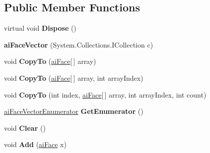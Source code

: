 \subsection*{Public Member Functions}
\begin{DoxyCompactItemize}
\item 
\hypertarget{classai_face_vector_a805a0fcb25db9628b91c89d6a337f52b}{virtual void {\bfseries Dispose} ()}\label{classai_face_vector_a805a0fcb25db9628b91c89d6a337f52b}

\item 
\hypertarget{classai_face_vector_a6437dba829bed1c5d00a5dac8d4e9a30}{{\bfseries ai\+Face\+Vector} (System.\+Collections.\+I\+Collection c)}\label{classai_face_vector_a6437dba829bed1c5d00a5dac8d4e9a30}

\item 
\hypertarget{classai_face_vector_a5ef358b28cd4c62b78876e46b5c23169}{void {\bfseries Copy\+To} (\hyperlink{structai_face}{ai\+Face}\mbox{[}$\,$\mbox{]} array)}\label{classai_face_vector_a5ef358b28cd4c62b78876e46b5c23169}

\item 
\hypertarget{classai_face_vector_a32642741070e3fc5a63b5b078556fe50}{void {\bfseries Copy\+To} (\hyperlink{structai_face}{ai\+Face}\mbox{[}$\,$\mbox{]} array, int array\+Index)}\label{classai_face_vector_a32642741070e3fc5a63b5b078556fe50}

\item 
\hypertarget{classai_face_vector_ae4019a8e13ed8bcb7df709e53d26e8c4}{void {\bfseries Copy\+To} (int index, \hyperlink{structai_face}{ai\+Face}\mbox{[}$\,$\mbox{]} array, int array\+Index, int count)}\label{classai_face_vector_ae4019a8e13ed8bcb7df709e53d26e8c4}

\item 
\hypertarget{classai_face_vector_acd404547f414c39ace482852cfef363a}{\hyperlink{classai_face_vector_1_1ai_face_vector_enumerator}{ai\+Face\+Vector\+Enumerator} {\bfseries Get\+Enumerator} ()}\label{classai_face_vector_acd404547f414c39ace482852cfef363a}

\item 
\hypertarget{classai_face_vector_ac2bec608a686b3da7ce30cb858910378}{void {\bfseries Clear} ()}\label{classai_face_vector_ac2bec608a686b3da7ce30cb858910378}

\item 
\hypertarget{classai_face_vector_ad9b62f68e104d484d3112bca1f8f4c83}{void {\bfseries Add} (\hyperlink{structai_face}{ai\+Face} x)}\label{classai_face_vector_ad9b62f68e104d484d3112bca1f8f4c83}


\end{DoxyCompactItemize}
